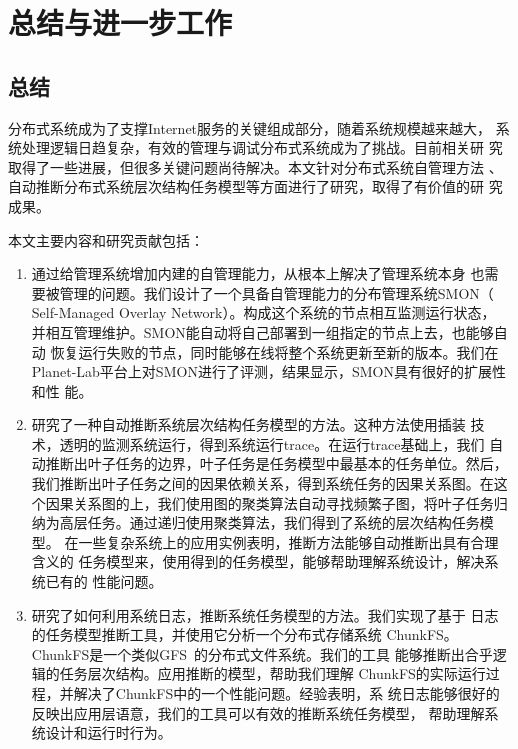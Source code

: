 \chapter{总结与进一步工作}
\label{chap:conclusion}

\section{总结}

分布式系统成为了支撑Internet服务的关键组成部分，随着系统规模越来越大，
系统处理逻辑日趋复杂，有效的管理与调试分布式系统成为了挑战。目前相关研
究取得了一些进展，但很多关键问题尚待解决。本文针对分布式系统自管理方法
、自动推断分布式系统层次结构任务模型等方面进行了研究，取得了有价值的研
究成果。

本文主要内容和研究贡献包括：

\begin{enumerate}
  
  \item 通过给管理系统增加内建的自管理能力，从根本上解决了管理系统本身
  也需要被管理的问题。我们设计了一个具备自管理能力的分布管理系统SMON（
  Self-Managed Overlay Network）。构成这个系统的节点相互监测运行状态，
  并相互管理维护。SMON能自动将自己部署到一组指定的节点上去，也能够自动
  恢复运行失败的节点，同时能够在线将整个系统更新至新的版本。我们在
  Planet-Lab平台上对SMON进行了评测，结果显示，SMON具有很好的扩展性和性
  能。

  \item 研究了一种自动推断系统层次结构任务模型的方法。这种方法使用插装
  技术，透明的监测系统运行，得到系统运行trace。在运行trace基础上，我们
  自动推断出叶子任务的边界，叶子任务是任务模型中最基本的任务单位。然后，
  我们推断出叶子任务之间的因果依赖关系，得到系统任务的因果关系图。在这
  个因果关系图的上，我们使用图的聚类算法自动寻找频繁子图，将叶子任务归
  纳为高层任务。通过递归使用聚类算法，我们得到了系统的层次结构任务模型。
  在一些复杂系统上的应用实例表明，推断方法能够自动推断出具有合理含义的
  任务模型来，使用得到的任务模型，能够帮助理解系统设计，解决系统已有的
  性能问题。

  \item 研究了如何利用系统日志，推断系统任务模型的方法。我们实现了基于
  日志的任务模型推断工具，并使用它分析一个分布式存储系统
  ChunkFS。ChunkFS是一个类似GFS~\cite{gfs}的分布式文件系统。我们的工具
  能够推断出合乎逻辑的任务层次结构。应用推断的模型，帮助我们理解
  ChunkFS的实际运行过程，并解决了ChunkFS中的一个性能问题。经验表明，系
  统日志能够很好的反映出应用层语意，我们的工具可以有效的推断系统任务模型，
  帮助理解系统设计和运行时行为。

\end{enumerate}

